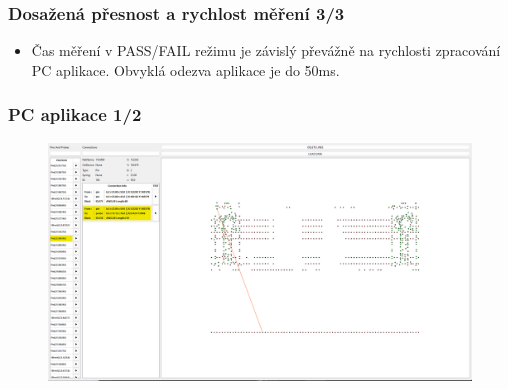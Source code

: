 \documentclass[%
  12pt,       				%
	t,                  %
	aspectratio=1610,   %
	unicode,						%
]{beamer}				    	%
\begin{document}
\begin{frame} 
	\frametitle{Dosažená přesnost a rychlost měření 3/3}
	\vspace*{0.7cm}
	\begin{table}[ht!]
	\centering
		\caption{Chyby měření odporů vůči pinu č. 1}
		\label{tab:chyby mereni calibrated}
	\end{table}

	\begin{itemize}
		\item Čas měření v PASS/FAIL režimu je závislý převážně na rychlosti zpracování PC aplikace. Obvyklá odezva aplikace je do 50ms.
	\end{itemize}
\end{frame}





\begin{frame} 
	\frametitle{PC aplikace 1/2}

	\begin{figure}[ht!]
		\centering
		\includegraphics[width = 1\textwidth]{obrazky/PC_APP_dataViewer.png}
	\end{figure}
\end{frame}
\end{document}
